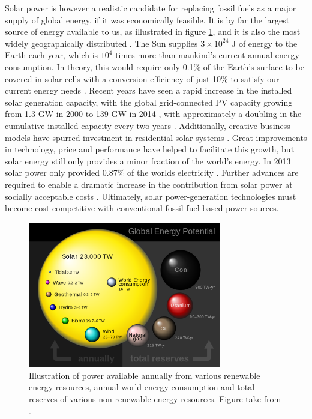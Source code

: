 Solar power is however a realistic candidate for replacing fossil fuels as a major supply of global energy, if it was economically feasible. It is by far the largest source of energy available to us, as illustrated in figure \ref{global_energy}, and it is also the most widely geographically distributed \cite{inorg_pv}. The Sun supplies $3 \times 10^{24}$ J of energy to the Earth each year, which is $10^4$ times more than mankind's current annual energy consumption. In theory, this would require only 0.1\% of the Earth's surface to be covered in solar cells with a conversion efficiency of just 10\% to satisfy our current energy needs \cite{Gratzel}. Recent years have seen a rapid increase in the installed solar generation capacity, with the global grid-connected PV capacity growing from 1.3 GW in 2000 to 139 GW in 2014 \cite{pathways_129}, with approximately a doubling in the cumulative installed capacity every two years \cite{pathways}. Additionally, creative business models have spurred investment in residential solar systems \cite{MIT}. Great improvements in technology, price and performance have helped to facilitate this growth, but solar energy still only provides a minor fraction of the world's energy. In 2013 solar power only provided 0.87\% of the worlds electricity \cite{pathways_130}. Further advances are required to enable a dramatic increase in the contribution from solar power at socially acceptable costs \cite{MIT}. Ultimately, solar power-generation technologies must become cost-competitive with conventional fossil-fuel based power sources.\\

\begin{figure}[h!]
  \centering
    \includegraphics[width=0.75\textwidth]{figures/global_energy.png}
    \caption{Illustration of power available annually from various renewable energy resources, annual world energy consumption and total reserves of various non-renewable energy resources. Figure take from .}
  \label{global_energy}
\end{figure}

